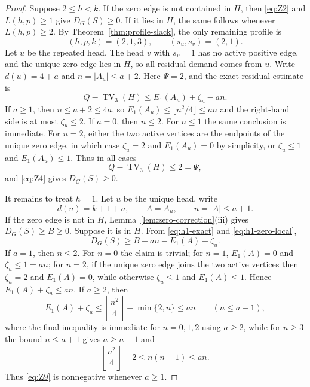 \documentclass[a4paper,11pt]{amsart}
\numberwithin{equation}{section}
\theoremstyle{definition}
\theoremstyle{remark}
\newcommand{\TV}{\operatorname{TV}}
\begin{document}
\begin{proof}
Suppose $2\le h<k$.  If the zero edge is not contained in $H$, then \eqref{eq:Z2} and $L(h,p)\ge1$ give $D_G(S)\ge0$.  If it lies in $H$, the same follows whenever $L(h,p)\ge2$.  By Theorem~\ref{thm:profile-slack}, the only remaining profile is
\begin{equation}
(h,p,k)=(2,1,3),
\qquad(s_u,s_v)=(2,1).
\label{eq:onezero-exception}
\end{equation}
Let $u$ be the repeated head.  The head $v$ with $s_v=1$ has no active positive edge, and the unique zero edge lies in $H$, so all residual demand comes from $u$.  Write $d(u)=4+a$ and $n=\lvert A_u\rvert\le a+2$.  Here $\Psi=2$, and the exact residual estimate is
\begin{equation}
Q-\TV_3(H)\le E_1(A_u)+\zeta_u-an.
\label{eq:exception-residual}
\end{equation}
If $a\ge1$, then $n\le a+2\le4a$, so $E_1(A_u)\le\lfloor n^2/4\rfloor\le an$ and the right-hand side is at most $\zeta_u\le2$.  If $a=0$, then $n\le2$.  For $n\le1$ the same conclusion is immediate.  For $n=2$, either the two active vertices are the endpoints of the unique zero edge, in which case $\zeta_u=2$ and $E_1(A_u)=0$ by simplicity, or $\zeta_u\le1$ and $E_1(A_u)\le1$.  Thus in all cases
\[
Q-\TV_3(H)\le2=\Psi,
\]
and \eqref{eq:Z4} gives $D_G(S)\ge0$.

It remains to treat $h=1$.  Let $u$ be the unique head, write
\begin{equation}
d(u)=k+1+a,
\qquad
A=A_u,
\qquad
n=\lvert A\rvert\le a+1.
\label{eq:onezero-h1-data}
\end{equation}
If the zero edge is not in $H$, Lemma~\ref{lem:zero-correction}(iii) gives $D_G(S)\ge B\ge0$.  Suppose it is in $H$.  From \eqref{eq:h1-exact} and \eqref{eq:h1-zero-local},
\begin{equation}
D_G(S)\ge B+an-E_1(A)-\zeta_u.
\label{eq:Z9}
\end{equation}
If $a=1$, then $n\le2$.  For $n=0$ the claim is trivial; for $n=1$, $E_1(A)=0$ and $\zeta_u\le1=an$; for $n=2$, if the unique zero edge joins the two active vertices then $\zeta_u=2$ and $E_1(A)=0$, while otherwise $\zeta_u\le1$ and $E_1(A)\le1$.  Hence $E_1(A)+\zeta_u\le an$.  If $a\ge2$, then
\begin{equation}
E_1(A)+\zeta_u
\le\left\lfloor\frac{n^2}{4}\right\rfloor+\min\{2,n\}
\le an
\qquad(n\le a+1),
\label{eq:a-ge-two}
\end{equation}
where the final inequality is immediate for $n=0,1,2$ using $a\ge2$, while for $n\ge3$ the bound $n\le a+1$ gives $a\ge n-1$ and
\[
\left\lfloor\frac{n^2}{4}\right\rfloor+2\le n(n-1)\le an.
\]
Thus \eqref{eq:Z9} is nonnegative whenever $a\ge1$.


\end{proof}
\end{document}
